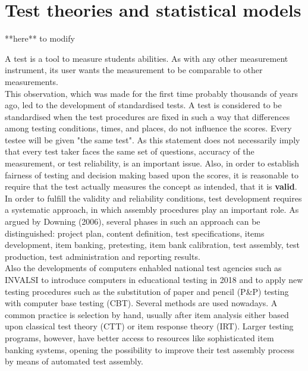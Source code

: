 
\chapter{Test theories and statistical models}
\label{ch:2}
**here** to modify
\par A test is a tool to measure students abilities. As with any other measurement instrument, its user wants the measurement to be comparable to other measurements. \\
This observation, which was made for the first time probably thousands of years ago, led to the development of standardised tests. A test is considered to be standardised when the test procedures are fixed in such a way that differences among testing conditions, times, and places, do not influence the scores. Every testee will be given "the same test". As this statement does not necessarily imply that every test taker faces the same set of questions, accuracy of the measurement, or test reliability, is an important issue. Also, in order to establish fairness of testing and decision making based upon the scores, it is reasonable to require that the test actually measures the concept as intended, that it is \textbf{valid}. \\
In order to fulfill the validity and reliability conditions, test development requires a systematic approach, in which assembly procedures play an important role. As argued by Downing (2006), several phases in such an approach can be distinguished:
project plan, content definition, test specifications, items development, item banking, pretesting, item bank calibration, test assembly, test production, test administration and reporting results. \\
Also the developments of computers enhabled national test agencies such as INVALSI to introduce computers in educational testing in 2018 and to apply new testing procedures such as the substitution of paper and pencil (P\&P) testing with computer base testing (CBT).
Several methods are used nowadays. A common practice is selection by hand, usually after item analysis either based upon classical test theory (CTT) or item response theory (IRT). Larger testing programs, however, have better access to resources like sophisticated item banking systems, opening the possibility to improve their test assembly process by means of automated test assembly. \\


